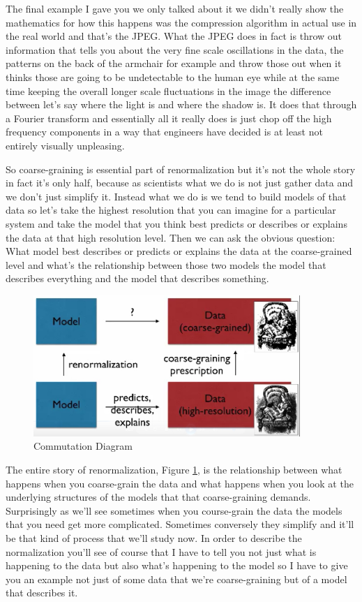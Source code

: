 \documentclass[]{article}
\begin{document}
The final example I gave you we only talked about
it we didn't really show the mathematics
for how this happens was the compression
algorithm in actual use in the real
world and that's the JPEG. What the JPEG
does in fact is throw out information
that tells you about the very
fine scale oscillations in the data, the
patterns on the back of the armchair for
example and throw those out when it
thinks those are going to be
undetectable to the human eye while at
the same time keeping the overall longer
scale fluctuations in the image the
difference between let's say where the
light is and where the shadow is. It does
that through a Fourier transform and
essentially all it really does is just
chop off the high frequency components
in a way that engineers have decided is
at least not entirely visually unpleasing.

 So coarse-graining is
essential part of renormalization but it's
not the whole story in fact it's only
half, because as scientists what we do is
not just gather data and we don't just
simplify it. Instead what we do is we
tend to build models of that data so
let's take the highest resolution that
you can imagine for a particular system
and take the model that you think best
predicts or describes or explains the
data at that high resolution level. Then
we can ask the obvious question: What
model best describes or predicts or
explains the data at the coarse-grained
level and what's the relationship
between those two models the model that
describes everything and the model that
describes something. 

\begin{figure}[H]
	\caption{Commutation Diagram}\label{fig:commutation}
	\includegraphics[width=0.9\textwidth]{commutation}
\end{figure}

The entire story of renormalization, Figure \ref{fig:commutation}, is the relationship between what happens when you coarse-grain the data and what happens
when you look at the underlying structures of the models that that
coarse-graining demands. Surprisingly as
we'll see sometimes when you course-grain the data the models that you need
get more complicated. Sometimes
conversely they simplify and it'll be
that kind of process that we'll study
now. In order to describe the
normalization you'll see of course that
I have to tell you not just what is
happening to the data but also what's
happening to the model so I have to give
you an example not just of some data
that we're coarse-graining but of a model
that describes it.
\end{document}
